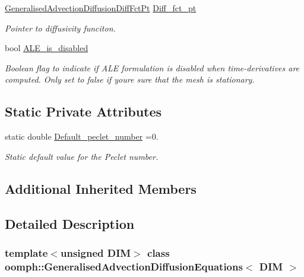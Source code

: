 \begin{DoxyCompactItemize}
\hyperlink{classoomph_1_1GeneralisedAdvectionDiffusionEquations_a637371a9eebc399023c6a652e8219263}{Generalised\+Advection\+Diffusion\+Diff\+Fct\+Pt} \hyperlink{classoomph_1_1GeneralisedAdvectionDiffusionEquations_a461bd7e2efcdd4620aa94ba70961bcc0}{Diff\+\_\+fct\+\_\+pt}
\begin{DoxyCompactList}\small\item\em Pointer to diffusivity funciton. \end{DoxyCompactList}\item 
bool \hyperlink{classoomph_1_1GeneralisedAdvectionDiffusionEquations_aa984fe8aeae0f3aedfd8e92c76ce9cd0}{A\+L\+E\+\_\+is\+\_\+disabled}
\begin{DoxyCompactList}\small\item\em Boolean flag to indicate if A\+LE formulation is disabled when time-\/derivatives are computed. Only set to false if you\textquotesingle{}re sure that the mesh is stationary. \end{DoxyCompactList}\end{DoxyCompactItemize}
\subsection*{Static Private Attributes}
\begin{DoxyCompactItemize}
\item 
static double \hyperlink{classoomph_1_1GeneralisedAdvectionDiffusionEquations_a2d278b9e194799a8b83602c37b61cc23}{Default\+\_\+peclet\+\_\+number} =0.
\begin{DoxyCompactList}\small\item\em Static default value for the Peclet number. \end{DoxyCompactList}\end{DoxyCompactItemize}
\subsection*{Additional Inherited Members}


\subsection{Detailed Description}
\subsubsection*{template$<$unsigned D\+IM$>$\newline
class oomph\+::\+Generalised\+Advection\+Diffusion\+Equations$<$ D\+I\+M $>$}

